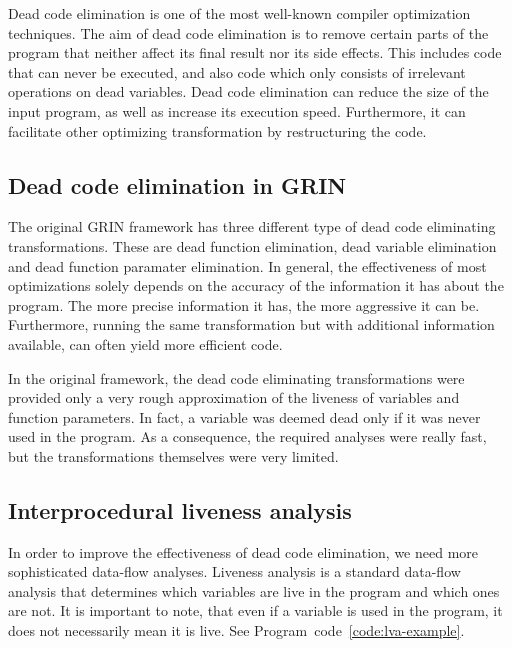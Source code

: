 \documentclass[main.tex]{subfiles}
\begin{document}
	
	Dead code elimination is one of the most well-known compiler optimization techniques. The aim of dead code elimination is to remove certain parts of the program that neither affect its final result nor its side effects. This includes code that can never be executed, and also code which only consists of irrelevant operations on dead variables. Dead code elimination can reduce the size of the input program, as well as increase its execution speed. Furthermore, it can facilitate other optimizing transformation by restructuring the code.
	
	\subsection{Dead code elimination in GRIN}
	
	The original GRIN framework has three different type of dead code eliminating transformations. These are dead function elimination, dead variable elimination and dead function paramater elimination. In general, the effectiveness of most optimizations solely depends on the accuracy of the information it has about the program. The more precise information it has, the more aggressive it can be. Furthermore, running the same transformation but with additional information available, can often yield more efficient code.
	
	In the original framework, the dead code eliminating transformations were provided only a very rough approximation of the liveness of variables and function parameters. In fact, a variable was deemed dead only if it was never used in the program. As a consequence, the required analyses were really fast, but the transformations themselves were very limited.
	
	\subsection{Interprocedural liveness analysis} \label{sub-sec:lva}
	
	In order to improve the effectiveness of dead code elimination, we need more sophisticated data-flow analyses. Liveness analysis is a standard data-flow analysis that determines which variables are live in the program and which ones are not. It is important to note, that even if a variable is used in the program, it does not necessarily mean it is live. See Program~code~\ref{code:lva-example}.
	
\end{document}
